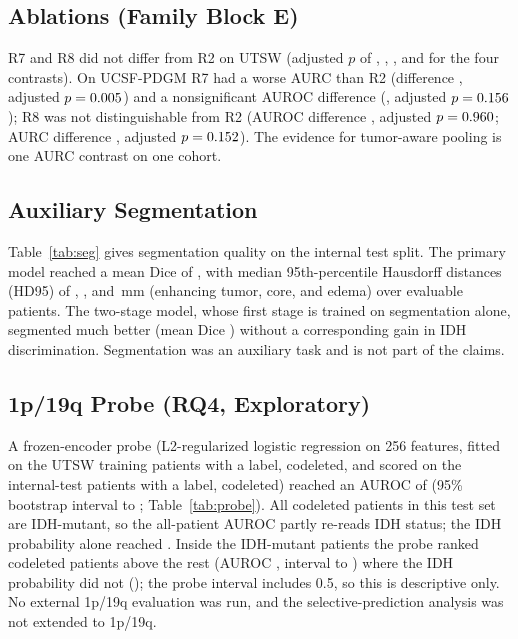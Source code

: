 \documentclass[journal]{IEEEtran}
\begin{document}
\subsection{Ablations (Family Block E)}
R7 and R8 did not differ from R2 on UTSW (adjusted $p$ of \numFamUEOneAdj, \numFamUETwoAdj, \numFamUEThreeAdj, and \numFamUEFourAdj{} for the four contrasts). On UCSF-PDGM R7 had a worse AURC than R2 (difference \numExtETwoDiff, adjusted $p=0.005$) and a nonsignificant AUROC difference (\numExtEOneDiff, adjusted $p=0.156$); R8 was not distinguishable from R2 (AUROC difference \numExtEThreeDiff, adjusted $p=0.960$; AURC difference \numExtEFourDiff, adjusted $p=0.152$). The evidence for tumor-aware pooling is one AURC contrast on one cohort.

\subsection{Auxiliary Segmentation}
Table~\ref{tab:seg} gives segmentation quality on the internal test split. The primary model reached a mean Dice of \numDiceRTwo{}, with median 95th-percentile Hausdorff distances (HD95) of \numHdEnhRTwo{}, \numHdCoreRTwo{}, and \numHdOedRTwo{}\,mm (enhancing tumor, core, and edema) over evaluable patients. The two-stage model, whose first stage is trained on segmentation alone, segmented much better (mean Dice \numDiceREight{}) without a corresponding gain in IDH discrimination. Segmentation was an auxiliary task and is not part of the claims.

\begin{table}[t]
\centering
\caption{Auxiliary Segmentation on the UTSW Internal Test Split: Dice and Median HD95 (mm, Evaluable Patients)}
\label{tab:seg}
\footnotesize
\resizebox{\columnwidth}{!}{}
\end{table}

\subsection{1p/19q Probe (RQ4, Exploratory)}
A frozen-encoder probe (L2-regularized logistic regression on 256 features, fitted on the \numProbeTrainN{} UTSW training patients with a label, \numProbeTrainCodel{} codeleted, and scored on the \numProbeN{} internal-test patients with a label, \numProbeCodel{} codeleted) reached an AUROC of \numProbeAuroc{} (95\% bootstrap interval \numProbeAurocLo{} to \numProbeAurocHi{}; Table~\ref{tab:probe}). All codeleted patients in this test set are IDH-mutant, so the all-patient AUROC partly re-reads IDH status; the IDH probability alone reached \numProbeIdhAuroc{}. Inside the \numProbeMutN{} IDH-mutant patients the probe ranked codeleted patients above the rest (AUROC \numProbeMutAuroc{}, interval \numProbeMutAurocLo{} to \numProbeMutAurocHi{}) where the IDH probability did not (\numProbeMutIdhAuroc{}); the probe interval includes 0.5, so this is descriptive only. No external 1p/19q evaluation was run, and the selective-prediction analysis was not extended to 1p/19q.
\end{document}
